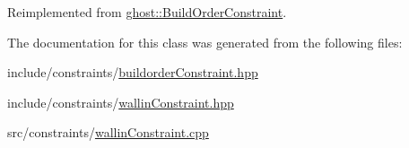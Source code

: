 Reimplemented from \hyperlink{classghost_1_1BuildOrderConstraint_a3ffc8f323b117f17c76cc6df522345ba}{ghost\-::\-Build\-Order\-Constraint}.



The documentation for this class was generated from the following files\-:\begin{DoxyCompactItemize}
\item 
include/constraints/\hyperlink{buildorderConstraint_8hpp}{buildorder\-Constraint.\-hpp}\item 
include/constraints/\hyperlink{wallinConstraint_8hpp}{wallin\-Constraint.\-hpp}\item 
src/constraints/\hyperlink{wallinConstraint_8cpp}{wallin\-Constraint.\-cpp}\end{DoxyCompactItemize}
